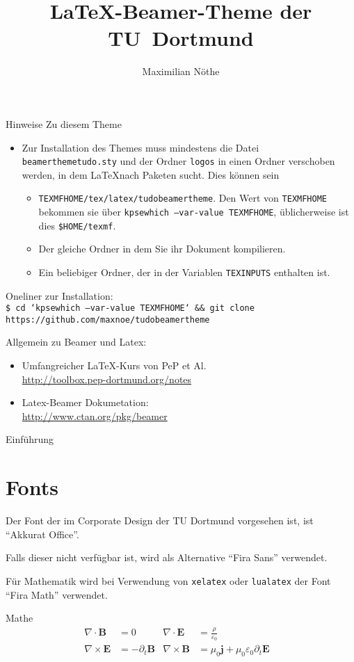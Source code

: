 \documentclass[aspectratio=1610, 9pt]{beamer}
\title{\LaTeX-Beamer-Theme der TU~Dortmund}
\author[M.~Nöthe]{Maximilian Nöthe}
\institute[Kurzform Lehrstuhl]{Names des Lehrstuhls \\  Name der Fakultät}
\begin{document}
\maketitle

\begin{frame}{Hinweise}
  Zu diesem Theme
  \begin{itemize}
    \item Zur Installation des Themes muss mindestens die Datei \texttt{beamerthemetudo.sty} und der Ordner \texttt{logos} in einen Ordner verschoben werden, in dem \LaTeX nach Paketen sucht.
      Dies können sein
      \begin{itemize}
        \item \texttt{TEXMFHOME/tex/latex/tudobeamertheme}. Den Wert von \texttt{TEXMFHOME} bekommen sie über \texttt{kpsewhich --var-value TEXMFHOME}, üblicherweise ist dies \texttt{\$HOME/texmf}.
        \item Der gleiche Ordner in dem Sie ihr Dokument kompilieren.
        \item Ein beliebiger Ordner, der in der Variablen \texttt{TEXINPUTS} enthalten ist.
      \end{itemize}
  \end{itemize}
  
  Oneliner zur Installation:\\
  \texttt{\footnotesize\$ cd `kpsewhich --var-value TEXMFHOME` \&\& git clone https://github.com/maxnoe/tudobeamertheme}

  \medskip
  Allgemein zu Beamer und Latex:
  \begin{itemize}
    \item Umfangreicher \LaTeX-Kurs von PeP et Al. \\
      \url{http://toolbox.pep-dortmund.org/notes}
    \item Latex-Beamer Dokumetation:\\
    \url{http://www.ctan.org/pkg/beamer}
  \end{itemize}
\end{frame}

\begin{frame}{Einführung}
  \tableofcontents
\end{frame}

\section{Fonts}
\begin{frame}
  Der Font der im Corporate Design der TU Dortmund vorgesehen ist,
  ist \enquote{Akkurat Office}.

  Falls dieser nicht verfügbar ist, wird als Alternative \enquote{Fira Sans}
  verwendet.

  Für Mathematik wird bei Verwendung von \texttt{xelatex} oder \texttt{lualatex} der Font \enquote{Fira Math} verwendet.
\end{frame}

\begin{frame}{Mathe}
  \begin{align*}
    \nabla \cdot \symbf{B} &= 0 &
    \nabla \cdot \symbf{E} &= \frac{ρ}{ε_0} \\
    \nabla \times \symbf{E} &= -\partial_t \symbf{B} &
    \nabla \times \symbf{B} &= μ_0 \symbf{j} + μ_0 ε_0 \partial_t \symbf{E} &
  \end{align*}
\end{frame}
\end{document}
